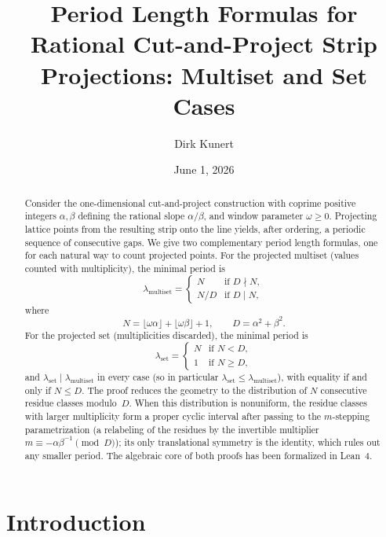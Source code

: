 \documentclass[11pt,reqno]{amsart}
\title[Period Length Formulas for Rational Cut-and-Project Projections]{%
  Period Length Formulas for Rational Cut-and-Project Strip Projections:
  Multiset and Set Cases}
\author{Dirk Kunert}
\date{June 1, 2026}
\theoremstyle{plain}
\theoremstyle{definition}
\theoremstyle{remark}
\begin{document}
\begin{abstract}
Consider the one-dimensional cut-and-project construction with coprime
positive integers \(\alpha,\beta\) defining the rational slope
\(\alpha/\beta\), and window parameter \(\omega \ge 0\).  Projecting lattice
points from the resulting strip onto the line yields, after ordering, a
periodic sequence of consecutive gaps.  We give two complementary period
length formulas, one for each natural way to count projected points.  For the
projected multiset (values counted with multiplicity), the minimal period is
\[
\lambda_{\mathrm{multiset}} =
\begin{cases}
N   & \text{if } D \nmid N, \\
N/D & \text{if } D \mid N,
\end{cases}
\]
where
\[
N=\lfloor\omega\alpha\rfloor+\lfloor\omega\beta\rfloor+1,
\qquad
D=\alpha^2+\beta^2.
\]
For the projected set (multiplicities discarded), the minimal period is
\[
\lambda_{\mathrm{set}} =
\begin{cases}
N & \text{if } N < D, \\
1 & \text{if } N \ge D,
\end{cases}
\]
and \(\lambda_{\mathrm{set}} \mid \lambda_{\mathrm{multiset}}\) in every
case (so in particular \(\lambda_{\mathrm{set}} \le \lambda_{\mathrm{multiset}}\)),
with equality if and only if \(N \le D\).  The proof reduces the
geometry to the distribution of \(N\) consecutive residue classes
modulo~\(D\).  When this distribution is nonuniform, the residue classes
with larger multiplicity form a proper cyclic interval after passing to the
\(m\)-stepping parametrization (a relabeling of the residues by the
invertible multiplier \(m \equiv -\alpha\beta^{-1} \pmod{D}\)); its only
translational symmetry is the identity,
which rules out any smaller period.  The algebraic core of both proofs
has been formalized in Lean~4.
\end{abstract}

\maketitle

\section{Introduction}\label{sec:intro}
\end{document}
